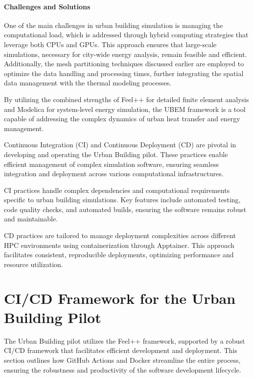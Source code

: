 \documentclass[runningheads]{llncs}
\begin{document}
\paragraph{Challenges and Solutions}
One of the main challenges in urban building simulation is managing the computational load, which is addressed through hybrid computing strategies that leverage both CPUs and GPUs. This approach ensures that large-scale simulations, necessary for city-wide energy analysis, remain feasible and efficient. Additionally, the mesh partitioning techniques discussed earlier are employed to optimize the data handling and processing times, further integrating the spatial data management with the thermal modeling processes.

By utilizing the combined strengths of Feel++ for detailed finite element analysis and Modelica for system-level energy simulation, the UBEM framework is a tool capable of addressing the complex dynamics of urban heat transfer and energy management.

Continuous Integration (CI) and Continuous Deployment (CD) are pivotal in developing and operating the Urban Building pilot. These practices enable efficient management of complex simulation software, ensuring seamless integration and deployment across various computational infrastructures.

CI practices handle complex dependencies and computational requirements specific to urban building simulations. Key features include automated testing, code quality checks, and automated builds, ensuring the software remains robust and maintainable.

CD practices are tailored to manage deployment complexities across different HPC environments using containerization through Apptainer. This approach facilitates consistent, reproducible deployments, optimizing performance and resource utilization.

\section{CI/CD Framework for the Urban Building Pilot}
The Urban Building pilot utilizes the Feel++ framework, supported by a robust CI/CD framework that facilitates efficient development and deployment. This section outlines how GitHub Actions and Docker streamline the entire process, ensuring the robustness and productivity of the software development lifecycle.
\end{document}
